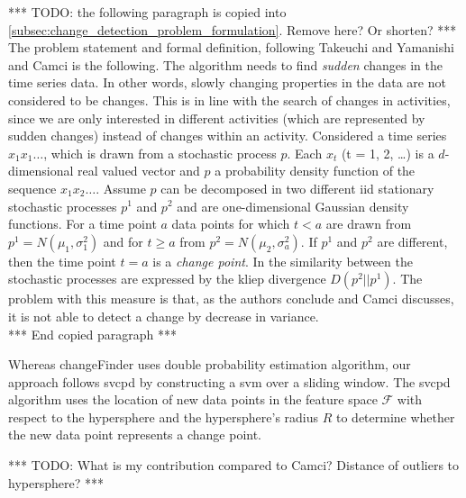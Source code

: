 *** TODO: the following paragraph is copied into \ref{subsec:change_detection_problem_formulation}. Remove here? Or shorten? ***\\
The problem statement and formal definition, following Takeuchi and Yamanishi \cite{takeuchi2006unifying} and Camci \cite{camci2010change} is the following.
The algorithm needs to find \emph{sudden} changes in the time series data.
In other words, slowly changing properties in the data are not considered to be changes.
This is in line with the search of changes in activities, since we are only interested in different activities (which are represented by sudden changes) instead of changes within an activity.
Considered a time series $x_1 x_1 \dots$, which is drawn from a stochastic process $p$.
Each $x_t$ (t = 1, 2, \dots) is a $d$-dimensional real valued vector and $p$ a probability density function of the sequence $x_1 x_2 \dots$.
Assume $p$ can be decomposed in two different \gls{iid} stationary stochastic processes $p^1$ and $p^2$ and are one-dimensional Gaussian density functions.
For a time point $a$ data points for which $t < a$ are drawn from $p^1 = N(\mu_1, \sigma_1^2)$ and for $t \geq a$ from $p^2 = N(\mu_2, \sigma_a^2)$.
If $p^1$ and $p^2$ are different, then the time point $t = a$ is a \emph{change point}.
In \cite{takeuchi2006unifying} the similarity between the stochastic processes are expressed by the \gls{kliep} divergence $D(p^2||p^1)$.
The problem with this measure is that, as the authors conclude and Camci discusses, it is not able to detect a change by decrease in variance.
\\*** End copied paragraph ***

Whereas \gls{changeFinder} uses double probability estimation algorithm, our approach follows \gls{svcpd} by constructing a \gls{svm} over a sliding window.
The \gls{svcpd} algorithm uses the location of new data points in the feature space $\mathcal{F}$ with respect to the hypersphere and the hypersphere's radius $R$ to determine whether the new data point represents a change point.

*** TODO: What is my contribution compared to Camci? Distance of outliers to hypersphere? ***